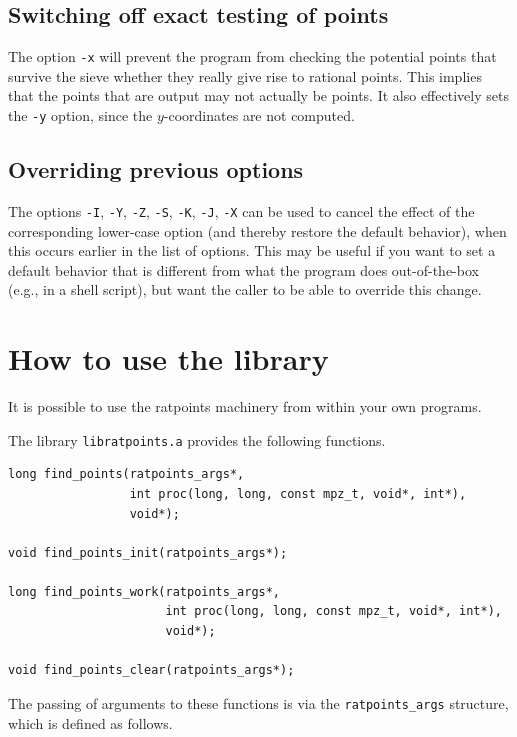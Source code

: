 \documentclass[12pt,a4paper,oneside]{amsart}
\begin{document}
\subsection{Switching off exact testing of points}

The option \verb+-x+ will prevent the program from checking the potential
points that survive the sieve whether they really give rise to rational
points. This implies that the points that are output may not actually
be points. It also effectively sets the \verb+-y+ option, since the
$y$-coordinates are not computed.

\subsection{Overriding previous options}

The options \verb+-I+, \verb+-Y+, \verb+-Z+, \verb+-S+, \verb+-K+, \verb+-J+,
\verb+-X+ can be used to cancel the effect of the corresponding lower-case
option (and thereby restore the default behavior),
when this occurs earlier in the list of options. This may be useful if
you want to set a default behavior that is different from what the
program does out-of-the-box (e.g., in a shell script), but want the caller
to be able to override this change.


\section{How to use the library}\label{sec:library}

It is possible to use the ratpoints machinery from within your own programs.

The library \texttt{libratpoints.a} provides the following functions.

\begin{verbatim}
long find_points(ratpoints_args*,
                 int proc(long, long, const mpz_t, void*, int*),
                 void*);

void find_points_init(ratpoints_args*);

long find_points_work(ratpoints_args*,
                      int proc(long, long, const mpz_t, void*, int*),
                      void*);

void find_points_clear(ratpoints_args*);
\end{verbatim}

The passing of arguments to these functions is via the \texttt{ratpoints\_args}
structure, which is defined as follows.
\end{document}
